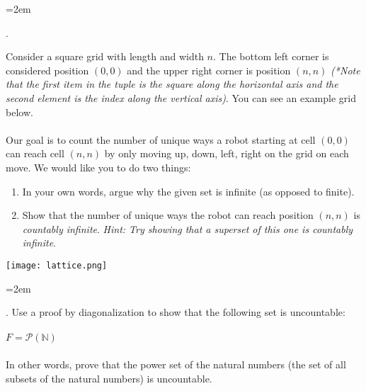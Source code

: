 \documentclass[12pt]{article}
\newcounter{quesnum}
\newcommand{\question}[2][??]{
\begin{list}{\labelitemi}{\leftmargin=2em}
\item [\arabic{quesnum}.] {} {#2}
\end{list}
\addtocounter{quesnum}{1}
}
\begin{document}
\vspace{12pt}



\question[3]{
Consider a square grid with length and width $n$. The bottom left corner is considered position $(0,0)$ and the upper right corner is position $(n,n)$ \emph{(*Note that the first item in the tuple is the square along the horizontal axis and the second element is the index along the vertical axis)}. You can see an example grid below.\\
\\
Our goal is to count the number of unique ways a robot starting at cell $(0,0)$ can reach cell $(n,n)$ by only moving up, down, left, right on the grid on each move. We would like you to do two things:

\begin{enumerate}
	\item In your own words, argue why the given set is infinite (as opposed to finite).
	\item Show that the number of unique ways the robot can reach position $(n,n)$ is \emph{countably infinite}. \emph{Hint: Try showing that a superset of this one is countably infinite}.
\end{enumerate}
}

\texttt{[image: lattice.png]}

\vspace{12pt}

\question[3]{
Use a proof by diagonalization to show that the following set is uncountable:\\
\\
$F= \mathcal{P}(\mathbb{N}) $
\\
\\
In other words, prove that the power set of the natural numbers (the set of all subsets of the natural numbers) is uncountable.
}

\vspace{12pt}
\end{document}
